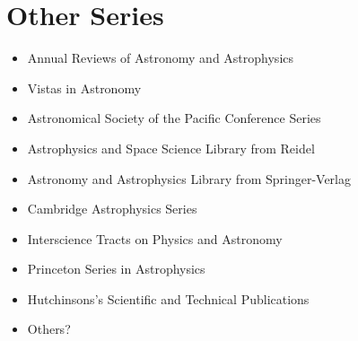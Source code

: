 \documentclass{article}
\begin{document}


\section{Other Series}

\begin{itemize}
\item Annual Reviews of Astronomy and Astrophysics
\item Vistas in Astronomy
\item Astronomical Society of the Pacific Conference Series
\item Astrophysics and Space Science Library from Reidel
\item Astronomy and Astrophysics Library from Springer-Verlag
\item Cambridge Astrophysics Series
\item Interscience Tracts on Physics and Astronomy
\item Princeton Series in Astrophysics
\item Hutchinsons's Scientific and Technical Publications
\item Others?
\end{itemize}
\end{document}
